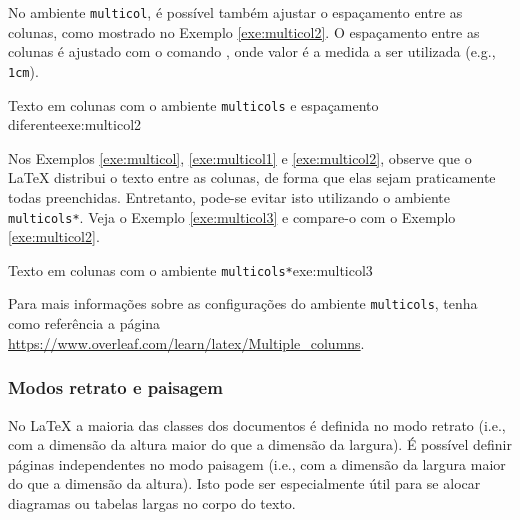No ambiente {\tt multicol}, é possível também ajustar o espaçamento entre as colunas, como mostrado no Exemplo \ref{exe:multicol2}. O espaçamento entre as colunas é ajustado com o comando \texttt{\setlength{\columnsep}{valor}}, onde valor é a medida a ser utilizada (e.g., {\tt 1cm}).

\begin{texexptitled}[breakable,enhanced,middle=2mm]{Texto em colunas com o ambiente {\tt multicols} e espaçamento diferente}{exe:multicol2}
\lipsumsentence[1-2]
\setlength{\columnsep}{2cm}
\begin{multicols}{3}
    \lipsum[3]
\end{multicols}
\lipsumsentence[5-6]
\end{texexptitled}

Nos Exemplos \ref{exe:multicol}, \ref{exe:multicol1} e \ref{exe:multicol2}, observe que o \LaTeX{} distribui o texto entre as colunas, de forma que elas sejam praticamente todas preenchidas. Entretanto, pode-se evitar isto utilizando o ambiente {\tt multicols*}. Veja o Exemplo \ref{exe:multicol3} e compare-o com o Exemplo \ref{exe:multicol2}.

\begin{texexptitled}[breakable,enhanced,middle=2mm]{Texto em colunas com o ambiente {\tt multicols*}}{exe:multicol3}
\lipsumsentence[1-2]
\setlength{\columnsep}{2cm}
\begin{multicols*}{3}
    \lipsum[3]
\end{multicols*}
\lipsumsentence[5-6]
\end{texexptitled}

\begin{marker}
  Para mais informações sobre as configurações do ambiente {\tt multicols}, tenha como referência a página \url{https://www.overleaf.com/learn/latex/Multiple_columns}.
\end{marker}

\subsubsection*{Modos retrato e paisagem}
\label{sec:retratopaisagem}

No \LaTeX{} a maioria das classes dos documentos é definida no modo retrato (i.e., com a dimensão da altura maior do que a dimensão da largura). É possível definir páginas independentes no modo paisagem (i.e., com a dimensão da largura maior do que a dimensão da altura). Isto pode ser especialmente útil para se alocar diagramas ou tabelas largas no corpo do texto.

